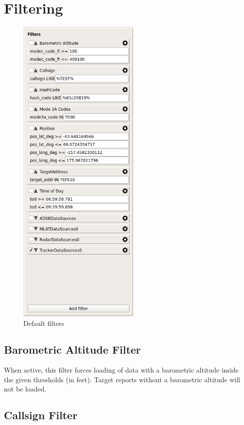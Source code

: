 \section{Filtering}
\label{sec:filtering}

\begin{figure}[H]
  \center
    \includegraphics[width=6cm,frame]{../screenshots/filtering_details.png}
  \caption{Default filters}
  \label{fig:filter_default}
\end{figure}

\subsection{Barometric Altitude Filter}

When active, this filter forces loading of data with a barometric altitude inside the given thresholds (in feet). Target reports without a barometric altitude will not be loaded.

\subsection{Callsign Filter}

